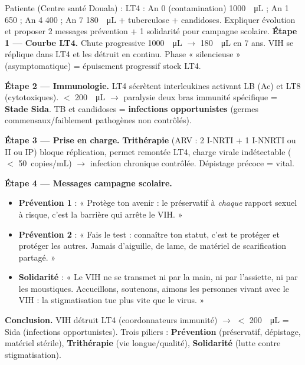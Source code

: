 \documentclass[11pt]{article}
\begin{document}
\begin{exoresolu}
Patiente (Centre santé Douala) : LT4 : An 0 (contamination) \SI{1000}{\per\micro\liter} ; An 1 \num{650} ; An 4 \num{400} ; An 7 \SI{180}{\per\micro\liter} + tuberculose + candidoses. Expliquer évolution et proposer 2 messages prévention + 1 solidarité pour campagne scolaire.
\tcblower
\textbf{Étape 1 — Courbe LT4.} Chute progressive \SI{1000}{\per\micro\liter} $\rightarrow$ \SI{180}{\per\micro\liter} en 7 ans. VIH se réplique dans LT4 et les détruit en continu. Phase « silencieuse » (asymptomatique) = épuisement progressif stock LT4.

\textbf{Étape 2 — Immunologie.} LT4 sécrètent interleukines activant LB (Ac) et LT8 (cytotoxiques). $<$ \SI{200}{\per\micro\liter} $\rightarrow$ paralysie deux bras immunité spécifique = \textbf{Stade Sida}. TB et candidoses = \textbf{infections opportunistes} (germes commensaux/faiblement pathogènes non contrôlés).

\textbf{Étape 3 — Prise en charge.} \textbf{Trithérapie} (ARV : 2 I-NRTI + 1 I-NNRTI ou II ou IP) bloque réplication, permet remontée LT4, charge virale indétectable ($<$ \SI{50}{copies/mL}) $\rightarrow$ infection chronique contrôlée. Dépistage précoce = vital.

\textbf{Étape 4 — Messages campagne scolaire.}
\begin{itemize}
\item \textbf{Prévention 1} : « Protège ton avenir : le préservatif à \emph{chaque} rapport sexuel à risque, c'est la barrière qui arrête le VIH. »
\item \textbf{Prévention 2} : « Fais le test : connaître ton statut, c'est te protéger et protéger les autres. Jamais d'aiguille, de lame, de matériel de scarification partagé. »
\item \textbf{Solidarité} : « Le VIH ne se transmet ni par la main, ni par l'assiette, ni par les moustiques. Accueillons, soutenons, aimons les personnes vivant avec le VIH : la stigmatisation tue plus vite que le virus. »
\end{itemize}
\textbf{Conclusion.} VIH détruit LT4 (coordonnateurs immunité) $\rightarrow$ $<$ \SI{200}{\per\micro\liter} = Sida (infections opportunistes). Trois piliers : \textbf{Prévention} (préservatif, dépistage, matériel stérile), \textbf{Trithérapie} (vie longue/qualité), \textbf{Solidarité} (lutte contre stigmatisation).
\end{exoresolu}
\end{document}

